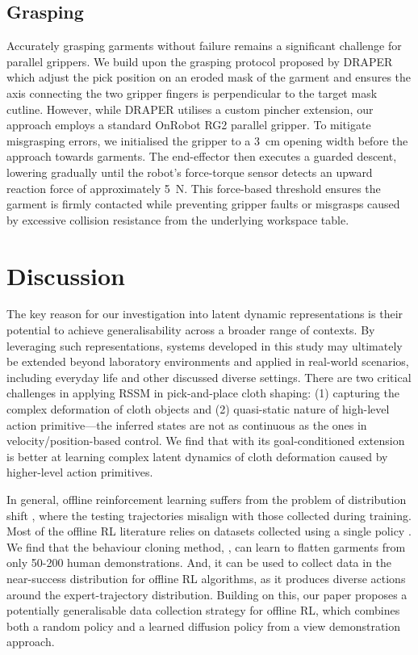 \documentclass[journal]{IEEEtran}
\begin{document}
\subsection{Grasping} \label{sec:grasping}

Accurately grasping garments without failure remains a significant challenge for parallel grippers. We build upon the grasping protocol proposed by DRAPER \cite{kadi2025draper} which adjust the pick position on an eroded mask of the garment and ensures the axis connecting the two gripper fingers is perpendicular to the target mask cutline. However, while DRAPER utilises a custom pincher extension, our approach employs a standard OnRobot RG2 parallel gripper. To mitigate misgrasping errors, we initialised the gripper to a 3~cm opening width before the approach towards garments. The end-effector then executes a guarded descent, lowering gradually until the robot's force-torque sensor detects an upward reaction force of approximately 5~N. This force-based threshold ensures the garment is firmly contacted while preventing gripper faults or misgrasps caused by excessive collision resistance from the underlying workspace table.


\section{Discussion} \label{sec:discussion}

The key reason for our investigation into latent dynamic representations is their potential to achieve generalisability across a broader range of contexts. By leveraging such representations, systems developed in this study may ultimately be extended beyond laboratory environments and applied in real-world scenarios, including everyday life and other discussed diverse settings. There are two critical challenges in applying RSSM in pick-and-place cloth shaping: (1) capturing the complex deformation of cloth objects and (2) quasi-static nature of high-level action primitive---the inferred states are not as  continuous as the ones in velocity/position-based control. We find that  \cite{hafner2019learning} with its goal-conditioned extension is better at learning complex latent dynamics of cloth deformation caused by higher-level action primitives.

In general, offline reinforcement learning suffers from the problem of distribution shift \cite{prudencio2023survey}, where the testing trajectories misalign with those collected during training. Most of the offline RL literature relies on datasets collected using a single policy \cite{agarwal2020optimistic}. We find that the behaviour cloning method,  \cite{chi2023diffusionpolicy}, can learn to flatten garments from only 50-200 human demonstrations. And, it can be used to collect data in the near-success distribution for offline RL algorithms, as it produces diverse actions around the expert-trajectory distribution. Building on this, our paper proposes a potentially generalisable data collection strategy for offline RL, which combines both a random policy and a learned diffusion policy from a view demonstration approach.
\end{document}
